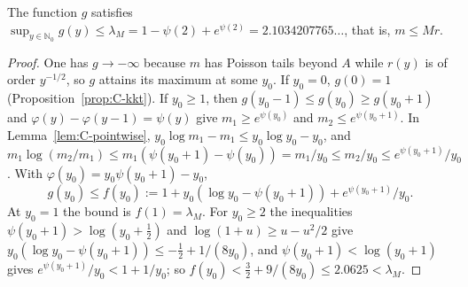 \begin{proposition}\label{prop:C-upper}
The function $g$ satisfies $\sup_{y\in\mathbb N_0}g(y)\le\lambda_M=1-\psi(2)+e^{\psi(2)}=2.1034207765\ldots$, that is, $m\le Mr$.
\end{proposition}
\begin{proof}
One has $g\to-\infty$ because $m$ has Poisson tails beyond $A$ while $r(y)$ is of order $y^{-1/2}$, so $g$ attains its maximum at some $y_0$.
If $y_0=0$, $g(0)=1$ (Proposition~\ref{prop:C-kkt}). If $y_0\ge1$, then $g(y_0-1)\le g(y_0)\ge g(y_0+1)$ and $\varphi(y)-\varphi(y-1)=\psi(y)$ give
$m_1\ge e^{\psi(y_0)}$ and $m_2\le e^{\psi(y_0+1)}$. In Lemma~\ref{lem:C-pointwise}, $y_0\log m_1-m_1\le y_0\log y_0-y_0$, and
$m_1\log(m_2/m_1)\le m_1(\psi(y_0+1)-\psi(y_0))=m_1/y_0\le m_2/y_0\le e^{\psi(y_0+1)}/y_0$. With $\varphi(y_0)=y_0\psi(y_0+1)-y_0$,
\[
g(y_0)\le f(y_0):=1+y_0(\log y_0-\psi(y_0+1))+e^{\psi(y_0+1)}/y_0 .
\]
At $y_0=1$ the bound is $f(1)=\lambda_M$. For $y_0\ge2$ the inequalities $\psi(y_0+1)>\log(y_0+\frac12)$ and $\log(1+u)\ge u-u^2/2$ give
$y_0(\log y_0-\psi(y_0+1))\le-\frac12+1/(8y_0)$, and $\psi(y_0+1)<\log(y_0+1)$ gives $e^{\psi(y_0+1)}/y_0<1+1/y_0$; so
$f(y_0)<\frac32+9/(8y_0)\le2.0625<\lambda_M$.
\end{proof}

